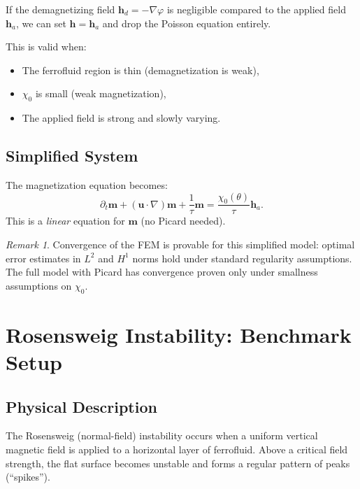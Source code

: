 \documentclass[11pt,a4paper]{article}
\theoremstyle{definition}
\theoremstyle{remark}
\newtheorem{remark}[proposition]{Remark}
\newcommand{\dt}{\partial_t}
\newcommand{\grad}{\nabla}
\newcommand{\bfu}{\bm{u}}
\newcommand{\bfm}{\bm{m}}
\newcommand{\bfh}{\bm{h}}
\begin{document}
If the demagnetizing field $\bfh_d = -\grad\varphi$ is negligible
compared to the applied field $\bfh_a$, we can set $\bfh = \bfh_a$ and
drop the Poisson equation entirely.

This is valid when:
\begin{itemize}[nosep]
  \item The ferrofluid region is thin (demagnetization is weak),
  \item $\chi_0$ is small (weak magnetization),
  \item The applied field is strong and slowly varying.
\end{itemize}

\subsection{Simplified System}

The magnetization equation becomes:
\begin{equation}
  \label{eq:simple-mag}
  \dt\bfm + (\bfu\cdot\grad)\bfm + \frac{1}{\tau}\bfm
  = \frac{\chi_0(\theta)}{\tau}\bfh_a.
\end{equation}
This is a \emph{linear} equation for $\bfm$ (no Picard needed).

\begin{remark}
  Convergence of the FEM is provable for this simplified model: optimal
  error estimates in $L^2$ and $H^1$ norms hold under standard regularity
  assumptions. The full model with Picard has convergence proven only
  under smallness assumptions on $\chi_0$.
\end{remark}


\section{Rosensweig Instability: Benchmark Setup}
\label{sec:rosensweig}

\subsection{Physical Description}

The Rosensweig (normal-field) instability occurs when a uniform
vertical magnetic field is applied to a horizontal layer of ferrofluid.
Above a critical field strength, the flat surface becomes unstable and
forms a regular pattern of peaks (``spikes'').
\end{document}
